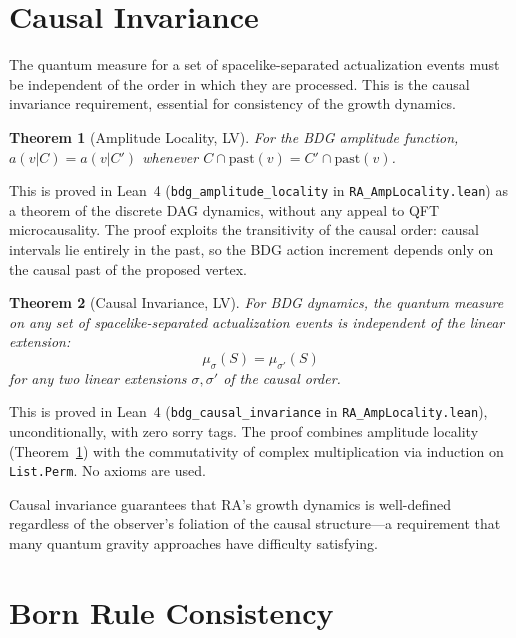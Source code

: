 \documentclass[11pt,a4paper]{article}
\theoremstyle{plain}
\newtheorem{theorem}{Theorem}[section]
\theoremstyle{definition}
\theoremstyle{remark}
\begin{document}
\section{Causal Invariance}\label{sec:causal}

The quantum measure for a set of spacelike-separated actualization events must be
independent of the order in which they are processed.  This is the causal invariance
requirement, essential for consistency of the growth dynamics.

\begin{theorem}[Amplitude Locality, LV]\label{thm:amploc}
For the BDG amplitude function, $a(v|C) = a(v|C')$ whenever
$C \cap \mathrm{past}(v) = C' \cap \mathrm{past}(v)$.
\end{theorem}

This is proved in Lean~4 (\texttt{bdg\_amplitude\_locality} in
\texttt{RA\_AmpLocality.lean}) as a theorem of the discrete DAG dynamics, without
any appeal to QFT microcausality.  The proof exploits the transitivity of the
causal order: causal intervals lie entirely in the past, so the BDG action increment
depends only on the causal past of the proposed vertex.

\begin{theorem}[Causal Invariance, LV]\label{thm:causal}
For BDG dynamics, the quantum measure on any set of
spacelike-separated actualization events is independent of the linear
extension:
\begin{equation}
\mu_\sigma(S) = \mu_{\sigma'}(S)
\label{eq:causal}
\end{equation}
for any two linear extensions $\sigma, \sigma'$ of the causal order.
\end{theorem}

This is proved in Lean~4 (\texttt{bdg\_causal\_invariance} in
\texttt{RA\_AmpLocality.lean}), unconditionally, with zero sorry tags.  The proof
combines amplitude locality (Theorem~\ref{thm:amploc}) with the commutativity of
complex multiplication via induction on \texttt{List.Perm}.  No axioms are used.

Causal invariance guarantees that RA's growth dynamics is well-defined regardless of
the observer's foliation of the causal structure---a requirement that many quantum
gravity approaches have difficulty satisfying.

\section{Born Rule Consistency}\label{sec:born}
\end{document}
